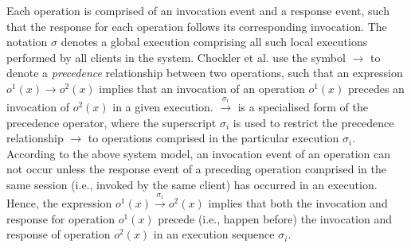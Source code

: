 \documentclass[journal,compsoc]{IEEEtran}
\begin{document}
 Each operation is comprised of an invocation event and a response event, such that %
  the response for each operation follows its corresponding invocation. The notation $\sigma$ denotes a global execution comprising all such local executions performed by all clients in the system. Chockler et al. use the symbol $\rightarrow$ to denote a   \emph{precedence} relationship \cite{Bailis:2013:BCC:2463676.2465279} between two operations, such that an expression $\mathit{o}^1(x) \rightarrow \mathit{o}^2(x)$ implies that an invocation of an operation $\mathit{o}^1(x)$ precedes an invocation of $\mathit{o}^2(x)$ in a given execution.  $\xrightarrow{\sigma_i}$ is a specialised form of the precedence operator, where the superscript $\sigma_i$ is used to restrict the precedence relationship $\rightarrow$ to operations comprised in the  particular execution  $\sigma_i$.  According to the above system model, %
  an invocation event of an operation can not occur unless the response event of a preceding operation comprised in the same session (i.e., invoked by the same client) has occurred in an execution. Hence, the expression $\mathit{o}^1(x) \xrightarrow{\sigma_i} \mathit{o}^2(x)$
  implies that both the invocation and response for operation $\mathit{o}^1(x)$ precede (i.e., happen before) the invocation and response of operation $\mathit{o}^2(x)$ in an execution sequence $\sigma_i$.  %
\end{document}
